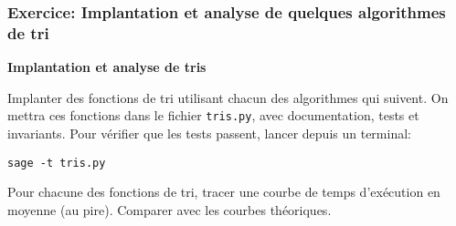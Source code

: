 \subsubsection{Exercice: Implantation et analyse de quelques algorithmes
de tri}

\textbf{Implantation et analyse de tris}

Implanter des fonctions de tri utilisant chacun des algorithmes qui
suivent. On mettra ces fonctions dans le fichier \texttt{tris.py}, avec
documentation, tests et invariants. Pour vérifier que les tests passent,
lancer depuis un terminal:

\begin{verbatim}
sage -t tris.py
\end{verbatim}

Pour chacune des fonctions de tri, tracer une courbe de temps
d'exécution en moyenne (au pire). Comparer avec les courbes théoriques.

